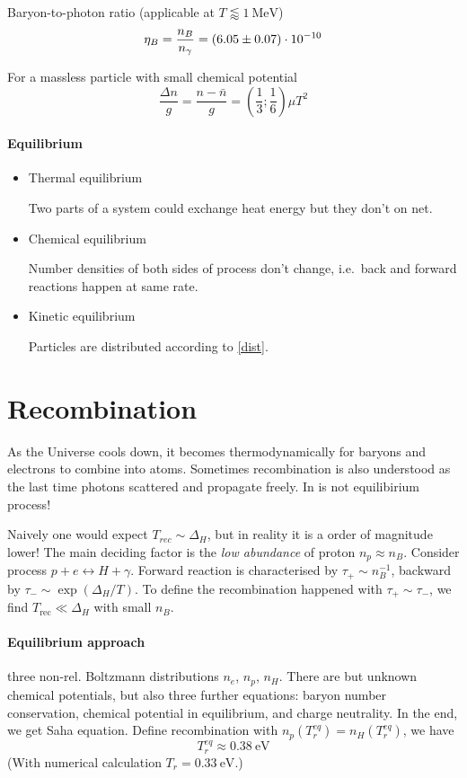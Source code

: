 \documentclass[12pt, a4paper, DIV=15]{article}
\numberwithin{equation}{section}
\begin{document}
Baryon-to-photon ratio (applicable at $T \lessapprox \SI{1}{\mega\eV}$)
\begin{equation}
   \eta_B = \frac{n_B}{n_\gamma} = (\num{6.05 +- 0.07} )\cdot 10^{-10}
\end{equation}

For a massless particle with small chemical potential
\begin{equation}
   \frac{\Delta n}{g} = \frac{n - \bar{n}}{g} = (\frac{1}{3}; \frac{1}{6}) \mu T^2
\end{equation}
\paragraph{Equilibrium}
\begin{itemize}
   \item  Thermal equilibrium

      Two parts of a system could exchange heat energy but they don't on net.

   \item Chemical equilibrium

      Number densities of both sides of process don't change, i.e.~back and forward reactions happen at same rate.

   \item Kinetic equilibrium

      Particles are distributed according to \eqref{dist}.
\end{itemize}

\section{Recombination}
As the Universe cools down, it becomes thermodynamically for baryons and electrons to combine into atoms. Sometimes recombination is also understood as the last time photons scattered and propagate freely. In is not equilibirium process!

Naively one would expect $T_{rec} \sim \Delta_H$, but in reality it is a order of magnitude lower! The main deciding factor is the \textit{low abundance} of proton $n_p \approx n_B$. Consider process $p + e \leftrightarrow H + \gamma$. Forward reaction is characterised by $\tau_+ \sim n_B^{-1}$,  backward  by $\tau_- \sim \exp(\Delta_H / T)$. To define the recombination happened with $\tau_+ \sim \tau_-$, we find $T_\text{rec} \ll \Delta_H $ with small $n_B$.

\paragraph{Equilibrium approach} three non-rel. Boltzmann distributions $n_e$, $n_p$, $n_H$. There are but unknown chemical potentials, but also three further equations: baryon number conservation, chemical potential in equilibrium, and charge neutrality. In the end, we get Saha equation. Define recombination with $n_p (T^{eq}_r) = n_H(T_r^{eq})$, we have
\begin{equation}
   T_r^{eq} \approx \SI{0.38}{\eV}
\end{equation}
(With numerical calculation $T_r = \SI{0.33}{\eV}$.)
\end{document}
